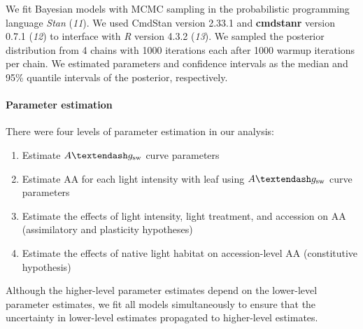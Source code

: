 \documentclass[
  letterpaper,
  DIV=11,
  numbers=noendperiod]{scrartcl}
\let\oldparagraph\paragraph
\renewcommand{\paragraph}[1]{\oldparagraph{#1}\mbox{}}
\providecommand{\tightlist}{%
  \setlength{\itemsep}{0pt}\setlength{\parskip}{0pt}}\usepackage{longtable,booktabs,array}
\newcommand{\aax}{$\mathrm{AA}$}
\newcommand{\agcurve}{$A \textendash g_\text{sw}$}
\begin{document}
We fit Bayesian models with MCMC sampling in the probabilistic
programming language \emph{Stan} (\emph{11}). We used CmdStan version
2.33.1 and \textbf{cmdstanr} version 0.7.1 (\emph{12}) to interface with
\emph{R} version 4.3.2 (\emph{13}). We sampled the posterior
distribution from 4 chains with 1000 iterations each after 1000 warmup
iterations per chain. We estimated parameters and confidence intervals
as the median and 95\% quantile intervals of the posterior,
respectively.

\paragraph{Parameter estimation}\label{parameter-estimation}

There were four levels of parameter estimation in our analysis:

\begin{enumerate}
\def\labelenumi{\arabic{enumi}.}
\tightlist
\item
  Estimate \agcurve{} curve parameters
\item
  Estimate \aax{} for each light intensity with leaf using \agcurve{}
  curve parameters
\item
  Estimate the effects of light intensity, light treatment, and
  accession on \aax{} (assimilatory and plasticity hypotheses)
\item
  Estimate the effects of native light habitat on accession-level \aax{}
  (constitutive hypothesis)
\end{enumerate}

Although the higher-level parameter estimates depend on the lower-level
parameter estimates, we fit all models simultaneously to ensure that the
uncertainty in lower-level estimates propagated to higher-level
estimates.
\end{document}
